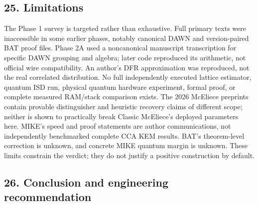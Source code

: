 \documentclass[
  10pt,
  a4paper,
]{article}
\begin{document}
\hypertarget{limitations}{%
\subsection{25. Limitations}\label{limitations}}

\begin{center}\end{center}

The Phase 1 survey is targeted rather than exhaustive. Full primary
texts were inaccessible in some earlier phases, notably canonical DAWN
and version-paired BAT proof files. Phase 2A used a noncanonical
manuscript transcription for specific DAWN grouping and algebra; later
code reproduced its arithmetic, not official wire compatibility. An
author's DFR approximation was reproduced, not the real correlated
distribution. No full independently executed lattice estimator, quantum
ISD run, physical quantum hardware experiment, formal proof, or complete
measured RAM/stack comparison exists. The 2026 McEliece preprints
contain provable distinguisher and heuristic recovery claims of
different scope; neither is shown to practically break Classic
McEliece's deployed parameters here. MIKE's speed and proof statements
are author communications, not independently benchmarked complete CCA
KEM results. BAT's theorem-level correction is unknown, and concrete
MIKE quantum margin is unknown. These limits constrain the verdict; they
do not justify a positive construction by default.

\hypertarget{conclusion-and-engineering-recommendation}{%
\subsection{26. Conclusion and engineering
recommendation}\label{conclusion-and-engineering-recommendation}}
\end{document}
